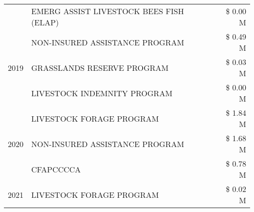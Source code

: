 \begin{tabular}{llr}
 & EMERG ASSIST LIVESTOCK BEES FISH (ELAP) & \$ 0.00 M \\
\cline{1-3}
\multirow[t]{3}{*}{2019} & NON-INSURED ASSISTANCE PROGRAM & \$ 0.49 M \\
 & GRASSLANDS RESERVE PROGRAM & \$ 0.03 M \\
 & LIVESTOCK INDEMNITY PROGRAM & \$ 0.00 M \\
\cline{1-3}
\multirow[t]{3}{*}{2020} & LIVESTOCK FORAGE PROGRAM & \$ 1.84 M \\
 & NON-INSURED ASSISTANCE PROGRAM & \$ 1.68 M \\
 & CFAPCCCCA & \$ 0.78 M \\
\cline{1-3}
2021 & LIVESTOCK FORAGE PROGRAM & \$ 0.02 M \\
\cline{1-3}
\bottomrule
\end{tabular}
